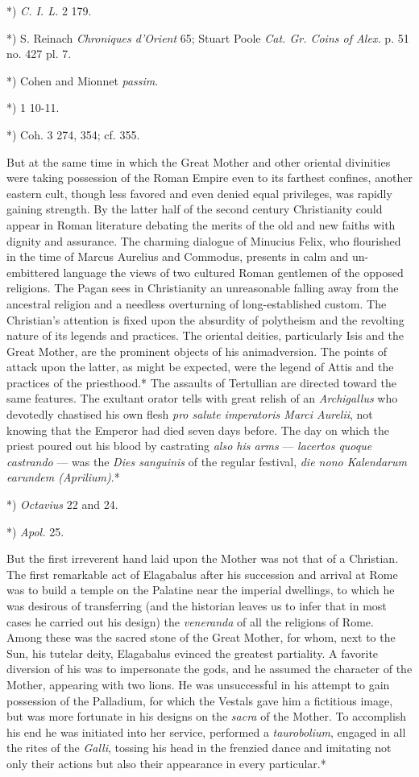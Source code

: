 \documentclass[a4paper, 11pt, oneside, polutonikogreek, english]{article}
\begin{document}
*) \emph{C. I. L.} 2 179.

*) S. Reinach \emph{Chroniques d'Orient} 65; Stuart Poole \emph{Cat. Gr. Coins of Alex.} p. 51 no. 427 pl. 7.

*) Cohen and Mionnet \emph{passim}.

*) 1 10-11.

*) Coh. 3 274, 354; cf. 355.

But at the same time in which the Great Mother and other oriental divinities were taking possession of the Roman Empire even to its farthest confines, another eastern cult, though less favored and even denied equal privileges, was rapidly gaining strength. By the latter half of the second century Christianity could appear in Roman literature debating the merits of the old and new faiths with dignity and assurance. The charming dialogue of Minucius Felix, who flourished in the time of Marcus Aurelius and Commodus, presents in calm and un-embittered language the views of two cultured Roman gentlemen of the opposed religions. The Pagan sees in Christianity an unreasonable falling away from the ancestral religion and a needless overturning of long-established custom. The Christian's attention is fixed upon the absurdity of polytheism and the revolting nature of its legends and practices. The oriental deities, particularly Isis and the Great Mother, are the prominent objects of his animadversion. The points of attack upon the latter, as might be expected, were the legend of Attis and the practices of the priesthood.* The assaults of Tertullian are directed toward the same features. The exultant orator tells with great relish of an \emph{Archigallus} who devotedly chastised his own flesh \emph{pro salute imperatoris Marci Aurelii}, not knowing that the Emperor had died seven days before. The day on which the priest poured out his blood by castrating \emph{also his arms} --- \emph{lacertos quoque castrando} --- was the \emph{Dies sanguinis} of the regular festival, \emph{die nono Kalendarum earundem (Aprilium)}.*

*) \emph{Octavius} 22 and 24.

*) \emph{Apol.} 25.

But the first irreverent hand laid upon the Mother was not that of a Christian. The first remarkable act of Elagabalus after his succession and arrival at Rome was to build a temple on the Palatine near the imperial dwellings, to which he was desirous of transferring (and the historian leaves us to infer that in most cases he carried out his design) the \emph{veneranda} of all the religions of Rome. Among these was the sacred stone of the Great Mother, for whom, next to the Sun, his tutelar deity, Elagabalus evinced the greatest partiality. A favorite diversion of his was to impersonate the gods, and he assumed the character of the Mother, appearing with two lions. He was unsuccessful in his attempt to gain possession of the Palladium, for which the Vestals gave him a fictitious image, but was more fortunate in his designs on the \emph{sacra} of the Mother. To accomplish his end he was initiated into her service, performed a \emph{taurobolium}, engaged in all the rites of the \emph{Galli}, tossing his head in the frenzied dance and imitating not only their actions but also their appearance in every particular.*
\end{document}
